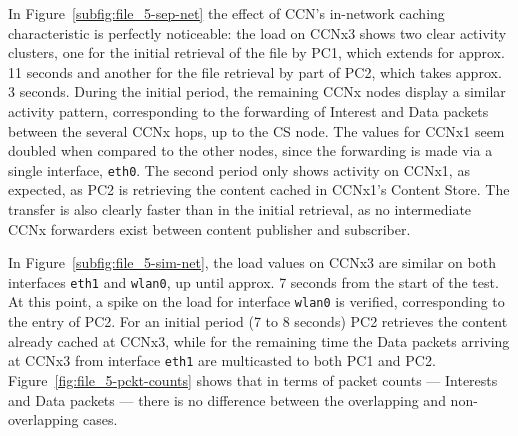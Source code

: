 In Figure~\ref{subfig:file_5-sep-net} the effect of CCN's in-network caching 
characteristic is perfectly noticeable: the load on CCNx3 shows two clear 
activity clusters, one for the initial retrieval of the file by PC1, which 
extends for approx. 11 seconds and another for the file retrieval 
by part of PC2, which takes approx. 3 seconds. During the initial period, the 
remaining CCNx nodes display a similar activity pattern, corresponding to 
the forwarding of Interest and Data packets between the several CCNx hops, up 
to the CS node. The values for CCNx1 seem doubled when compared to the other 
nodes, since the forwarding is made via a single interface, \verb+eth0+. The 
second period only shows activity on CCNx1, as expected, as PC2 is 
retrieving the content cached in CCNx1's Content Store. The transfer is 
also clearly faster than in the initial retrieval, as no intermediate CCNx 
forwarders exist between content publisher and subscriber.\vertbreak

In Figure~\ref{subfig:file_5-sim-net}, the load values 
on CCNx3 are similar on both interfaces \verb+eth1+ and \verb+wlan0+, up 
until approx. 7 seconds from the start of the test. At this point, a spike 
on the load for interface \verb+wlan0+ is verified, corresponding to the 
entry of PC2. For an initial period (7 to 8 seconds) PC2 retrieves the 
content already cached at CCNx3, while for the remaining time the Data packets 
arriving at CCNx3 from interface \verb+eth1+ are multicasted to both 
PC1 and PC2. Figure~\ref{fig:file_5-pckt-counts} shows that in terms of 
packet counts --- Interests and Data packets --- there is no difference between 
the overlapping and non-overlapping cases.\vertbreak

